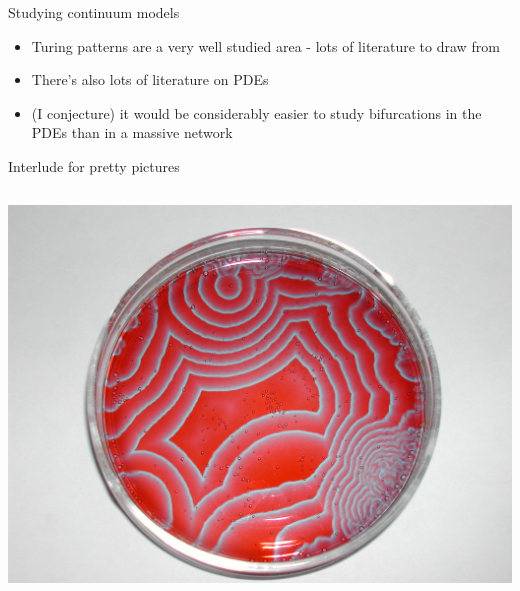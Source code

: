 \documentclass[presentation]{beamer}
\begin{document}
\begin{frame}[label={sec:org31e46a7}]{Studying continuum models}
\begin{itemize}
\item Turing patterns are a very well studied area - lots of literature to draw from
\item There's also lots of literature on PDEs
\item (I conjecture) it would be considerably easier to study bifurcations in the PDEs than in a massive network
\end{itemize}
\end{frame}

\begin{frame}[label={sec:orgd7db8ae}]{Interlude for pretty pictures}
\begin{columns}
\begin{column}{0.5\columnwidth}
\begin{center}
\includegraphics[width=.9\linewidth]{./BZ.jpg}
\end{center}
\end{column}


\end{columns}
\end{frame}
\end{document}
